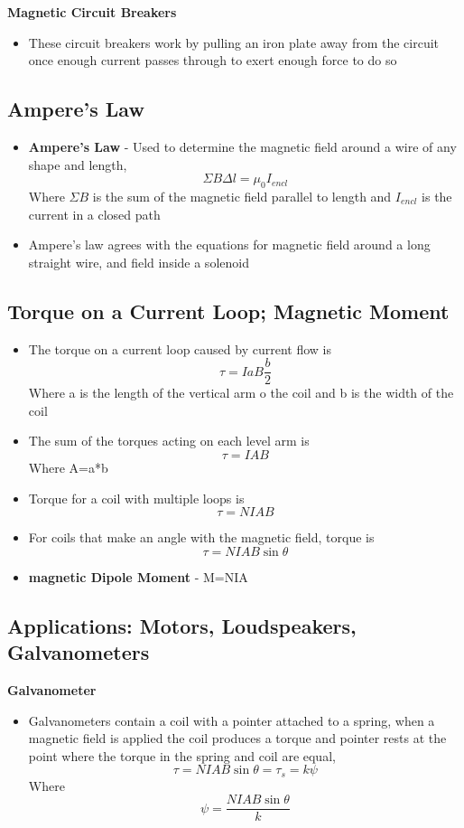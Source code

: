 \textbf{Magnetic Circuit Breakers}
\begin{itemize}
    \item These circuit breakers work by pulling an iron plate away from the circuit once enough current passes through to exert enough force to do so
\end{itemize}

\subsection{Ampere's Law}
\begin{itemize}
    \item \textbf{Ampere's Law} - Used to determine the magnetic field around a wire of any shape and length, \[\Sigma B\Delta l=\mu_0I_{encl}\] Where \(\Sigma B\) is the sum of the magnetic field parallel to length and \(I_{encl}\) is the current in a closed path
    \item Ampere's law agrees with the equations for magnetic field around a long straight wire, and field inside a solenoid
\end{itemize}

\subsection{Torque on a Current Loop; Magnetic Moment}
\begin{itemize}
    \item The torque on a current loop caused by current flow is \[\tau=IaB\frac{b}{2}\] Where a is the length of the vertical arm o the coil and b is the width of the coil
    \item The sum of the torques acting on each level arm is \[\tau=IAB\] Where A=a*b
    \item Torque for a coil with multiple loops is \[\tau=NIAB\]
    \item For coils that make an angle with the magnetic field, torque is \[\tau=NIAB\sin\theta\]
    \item \textbf{magnetic Dipole Moment} - M=NIA
\end{itemize}

\subsection{Applications: Motors, Loudspeakers, Galvanometers}
\textbf{Galvanometer}
\begin{itemize}
    \item Galvanometers contain a coil with a pointer attached to a spring, when a magnetic field is applied the coil produces a torque and pointer rests at the point where the torque in the spring and coil are equal, \[\tau=NIAB\sin\theta=\tau_s=k\psi\] Where \[\psi=\frac{NIAB\sin\theta}{k}\]
\end{itemize}

